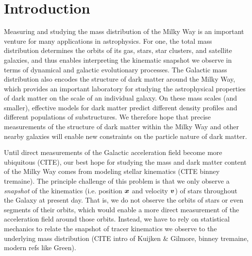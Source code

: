 \begin{abstract}
\end{abstract}


\section{Introduction} \label{sec:intro}


Measuring and studying the mass distribution of the Milky Way is an important venture
for many applications in astrophysics.
For one, the total mass distribution determines the orbits of its gas, stars, star
clusters, and satellite galaxies, and thus enables interpreting the kinematic snapshot
we observe in terms of dynamical and galactic evolutionary processes.
The Galactic mass distribution also encodes the structure of dark matter around the
Milky Way, which provides an important laboratory for studying the astrophysical
properties of dark matter on the scale of an individual galaxy.
On these mass scales (and smaller), effective models for dark matter predict different
density profiles and different populations of substructures.
We therefore hope that precise measurements of the structure of dark matter within the
Milky Way and other nearby galaxies will enable new constraints on the particle nature
of dark matter.

Until direct measurements of the Galactic acceleration field become more ubiquitous
(CITE), our best hope for studying the mass and dark matter content of the Milky Way
comes from modeling stellar kinematics (CITE binney tremaine).
The principle challenge of this problem is that we only observe a \emph{snapshot} of the
kinematics (i.e. position $\boldsymbol{x}$ and velocity $\boldsymbol{v}$) of stars throughout the Galaxy
at present day.
That is, we do not observe the orbits of stars or even segments of their orbits, which
would enable a more direct measurement of the acceleration field around those orbits.
Instead, we have to rely on statistical mechanics to relate the snapshot of tracer
kinematics we observe to the underlying mass distribution (CITE intro of Kuijken \&
Gilmore, binney tremaine, modern refs like Green).

